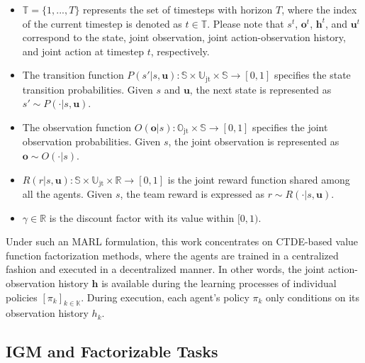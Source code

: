 \documentclass[twoside,11pt]{article}
\newcommand{\statespace}{\mathbb{S}}
\newcommand{\state}{s}
\newcommand{\timespace}{\mathbb{T}}
\newcommand{\horizon}{T}
\newcommand{\timestep}{t}
\newcommand{\jointactionspace}{\mathbb{U}}
\newcommand{\jointaction}{\mathbf{u}}
\newcommand{\statetransitionfunction}{P}
\newcommand{\rewardfunction}{R}
\newcommand{\reward}{r}
\newcommand{\jointobservationspace}{\mathbb{O}}
\newcommand{\jointobservation}{\mathbf{o}}
\newcommand{\jointobservationhistory}{\mathbf{h}}
\newcommand{\observationhistory}{h}
\newcommand{\observationfunction}{O}
\newcommand{\agentspace}{\mathbb{K}}
\newcommand{\agentcounter}{k}
\newcommand{\discountfactor}{\gamma}
\newcommand{\policy}{\pi}
\newcommand{\joint}{\mathrm{jt}}
\begin{document}
\begin{itemize}
\item $\timespace{}=\{1,...,\horizon{}\}$ represents the set of timesteps with horizon $\horizon{}$, where the index of the current timestep is denoted as $\timestep{}\in\timespace{}$. Please note that $\state^{\timestep}$, $\jointobservation^{\timestep}$, $\jointobservationhistory^{\timestep}$, and $\jointaction^{\timestep}$ correspond to the state, joint observation, joint action-observation history, and joint action
at timestep $\timestep$, respectively.

\item The transition function $\statetransitionfunction{}(\state{}'|\state{},\jointaction{}):\statespace{}\times\jointactionspace_{\joint}\times \statespace{}\rightarrow[0,1]$ specifies the state transition probabilities. Given $\state$ and $\jointaction$, the next state is represented as $\state{}'\sim\statetransitionfunction{}(\cdot|\state{},\jointaction{})$.

\item The observation function $\observationfunction{}({\jointobservation{}}|\state{}):\jointobservationspace_{\joint}\times\statespace{}\rightarrow[0,1]$ specifies the joint observation probabilities. Given $\state{}$, the joint observation is represented as $\jointobservation{}\sim\observationfunction{}(\cdot|\state{})$.

\item $\rewardfunction{}(\reward|\state{},\jointaction{}):\statespace{}\times\jointactionspace_{\joint}\times\mathbb{R}\rightarrow[0,1]$ is the joint reward function shared among all the agents. Given $\state$, the team reward is expressed as $\reward\sim\rewardfunction{}(\cdot|\state{},\jointaction{})$.

\item $\discountfactor{}\in\mathbb{R}$ is the discount factor with its value within $[0, 1)$.
\end{itemize}
Under such an MARL formulation, this work concentrates on CTDE-based value function factorization methods, where the agents are trained in a centralized fashion and executed in a decentralized manner. In other words, the joint action-observation history $\jointobservationhistory{}$ is available during the learning processes of individual policies $[\policy{}_{\agentcounter{}}]_{\agentcounter{}\in\agentspace{}}$. During execution, each agent's policy $\policy{}_{\agentcounter{}}$ only conditions on its observation history $\observationhistory{}_{\agentcounter{}}$.


\subsection{IGM and Factorizable Tasks}
\label{subsec:background_igm_and_factorizable_task}
\end{document}
